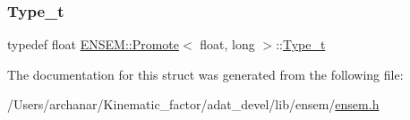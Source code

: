 \subsubsection{\texorpdfstring{Type\_t}{Type\_t}\hspace{0.1cm}{\footnotesize\ttfamily [2/2]}}
{\footnotesize\ttfamily typedef float \mbox{\hyperlink{structENSEM_1_1Promote}{E\+N\+S\+E\+M\+::\+Promote}}$<$ float, long $>$\+::\mbox{\hyperlink{structENSEM_1_1Promote_3_01float_00_01long_01_4_ab0b76c324678abb784e8e19c41e172c0}{Type\+\_\+t}}}



The documentation for this struct was generated from the following file\+:\begin{DoxyCompactItemize}
\item 
/\+Users/archanar/\+Kinematic\+\_\+factor/adat\+\_\+devel/lib/ensem/\mbox{\hyperlink{lib_2ensem_2ensem_8h}{ensem.\+h}}\end{DoxyCompactItemize}
